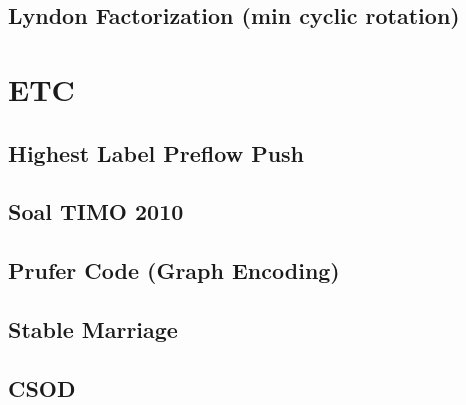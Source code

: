 \subsection{Lyndon Factorization (min cyclic rotation)}


\section{ETC}

\subsection{Highest Label Preflow Push}


\subsection{Soal TIMO 2010}


% 

% 

\subsection{Prufer Code (Graph Encoding)}


\subsection{Stable Marriage}


\subsection{CSOD}


